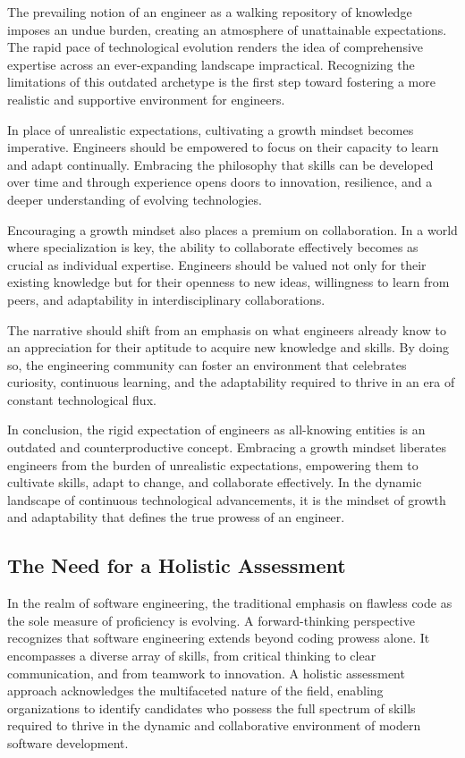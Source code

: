 \documentclass[
    a4paper, %
    10pt, %
    unnumberedsections, %
    twoside, %
]{LTJournalArticle}
\begin{document}
The prevailing notion of an engineer as a walking repository of knowledge imposes an undue burden, creating an atmosphere of unattainable expectations. The rapid pace of technological evolution renders the idea of comprehensive expertise across an ever-expanding landscape impractical. Recognizing the limitations of this outdated archetype is the first step toward fostering a more realistic and supportive environment for engineers.

In place of unrealistic expectations, cultivating a growth mindset becomes imperative. Engineers should be empowered to focus on their capacity to learn and adapt continually. Embracing the philosophy that skills can be developed over time and through experience opens doors to innovation, resilience, and a deeper understanding of evolving technologies.

Encouraging a growth mindset also places a premium on collaboration. In a world where specialization is key, the ability to collaborate effectively becomes as crucial as individual expertise. Engineers should be valued not only for their existing knowledge but for their openness to new ideas, willingness to learn from peers, and adaptability in interdisciplinary collaborations.

The narrative should shift from an emphasis on what engineers already know to an appreciation for their aptitude to acquire new knowledge and skills. By doing so, the engineering community can foster an environment that celebrates curiosity, continuous learning, and the adaptability required to thrive in an era of constant technological flux.

In conclusion, the rigid expectation of engineers as all-knowing entities is an outdated and counterproductive concept. Embracing a growth mindset liberates engineers from the burden of unrealistic expectations, empowering them to cultivate skills, adapt to change, and collaborate effectively. In the dynamic landscape of continuous technological advancements, it is the mindset of growth and adaptability that defines the true prowess of an engineer.

\subsection{The Need for a Holistic Assessment}

In the realm of software engineering, the traditional emphasis on flawless code as the sole measure of proficiency is evolving. A forward-thinking perspective recognizes that software engineering extends beyond coding prowess alone. It encompasses a diverse array of skills, from critical thinking to clear communication, and from teamwork to innovation. A holistic assessment approach acknowledges the multifaceted nature of the field, enabling organizations to identify candidates who possess the full spectrum of skills required to thrive in the dynamic and collaborative environment of modern software development.
\end{document}
